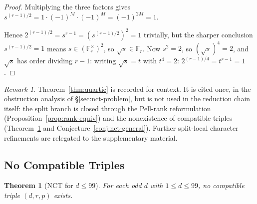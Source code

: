 \documentclass[11pt]{amsart}
\theoremstyle{plain}
\newtheorem{theorem}{Theorem}[section]
\theoremstyle{definition}
\theoremstyle{remark}
\newtheorem*{remarknonum}{Remark}
\numberwithin{equation}{section}
\newcommand{\F}{\mathbb{F}}
\begin{document}
\begin{proof}
Multiplying the three factors gives $s^{(r-1)/2} = 1 \cdot (-1)^M \cdot (-1)^M = (-1)^{2 M} = 1$.

Hence $2^{(r-1)/2} = s^{r-1} = (s^{(r-1)/2})^2 = 1$ trivially, but the sharper conclusion $s^{(r-1)/2} = 1$ means $s \in (\F_r^\times)^2$, so $\sqrt s \in \F_r$. Now $s^2 = 2$, so $(\sqrt s)^4 = 2$, and $\sqrt s$ has order dividing $r - 1$: writing $\sqrt s = t$ with $t^4 = 2$: $2^{(r-1)/4} = t^{r-1} = 1$.
\end{proof}

\begin{remarknonum}
Theorem~\ref{thm:quartic} is recorded for context. It is cited once, in the obstruction analysis of \S\ref{sec:nct-problem}, but is not used in the reduction chain itself: the split branch is closed through the Pell-rank reformulation (Proposition~\ref{prop:rank-equiv}) and the nonexistence of compatible triples (Theorem~\ref{thm:nct99} and Conjecture~\ref{conj:nct-general}). Further split-local character refinements are relegated to the supplementary material.
\end{remarknonum}

\subsection{No Compatible Triples}\label{sec:nct}

\begin{theorem}[NCT for $d \leq 99$]\label{thm:nct99}
For each odd $d$ with $1 \leq d \leq 99$, no compatible triple $(d, r, p)$ exists.
\end{theorem}
\end{document}
